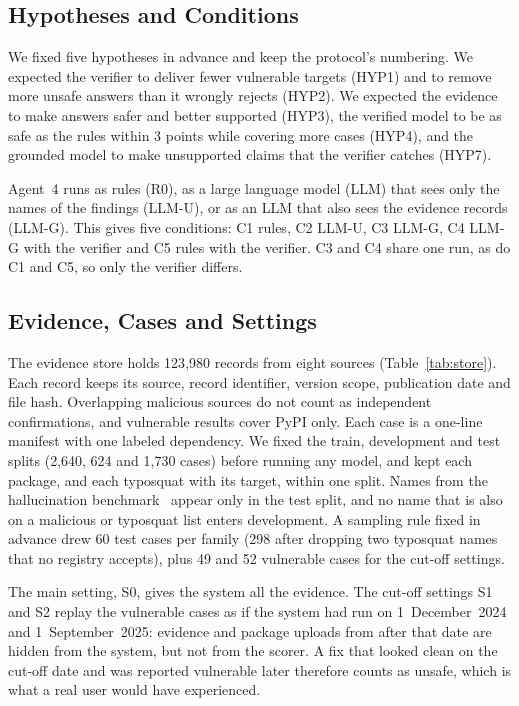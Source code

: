 \documentclass[conference]{IEEEtran}
\begin{document}
\subsection{Hypotheses and Conditions}
We fixed five hypotheses in advance and keep the protocol's numbering. We expected the verifier to deliver fewer
vulnerable targets (HYP1) and to remove more unsafe answers than it wrongly rejects (HYP2). We expected the evidence
to make answers safer and better supported (HYP3), the verified model to be as safe as the rules within 3 points
while covering more cases (HYP4), and the grounded model to make unsupported claims that the verifier catches (HYP7).

Agent~4 runs as rules (R0), as a large language model (LLM) that sees only the names of the findings (LLM-U), or as
an LLM that also sees the evidence records (LLM-G). This gives five conditions: C1 rules, C2 LLM-U, C3 LLM-G, C4
LLM-G with the verifier and C5 rules with the verifier. C3 and C4 share one run, as do C1 and C5, so only the
verifier differs.

\subsection{Evidence, Cases and Settings}
The evidence store holds 123{,}980 records from eight sources (Table~\ref{tab:store}). Each record keeps its source,
record identifier, version scope, publication date and file hash. Overlapping malicious sources do not count as
independent confirmations, and vulnerable results cover PyPI only. Each case is a one-line manifest with one labeled
dependency. We fixed the train, development and test splits (2{,}640, 624 and 1{,}730 cases) before running any
model, and kept each package, and each typosquat with its target, within one split. Names from the hallucination
benchmark~\cite{twist2026} appear only in the test split, and no name that is also on a malicious or typosquat list
enters development. A sampling rule fixed in advance drew 60 test cases per family (298 after dropping two typosquat
names that no registry accepts), plus 49 and 52 vulnerable cases for the cut-off settings.

The main setting, S0, gives the system all the evidence. The cut-off settings S1 and S2 replay the vulnerable cases
as if the system had run on 1~December~2024 and 1~September~2025: evidence and package uploads from after that date
are hidden from the system, but not from the scorer. A fix that looked clean on the cut-off date and was reported
vulnerable later therefore counts as unsafe, which is what a real user would have experienced.
\end{document}
